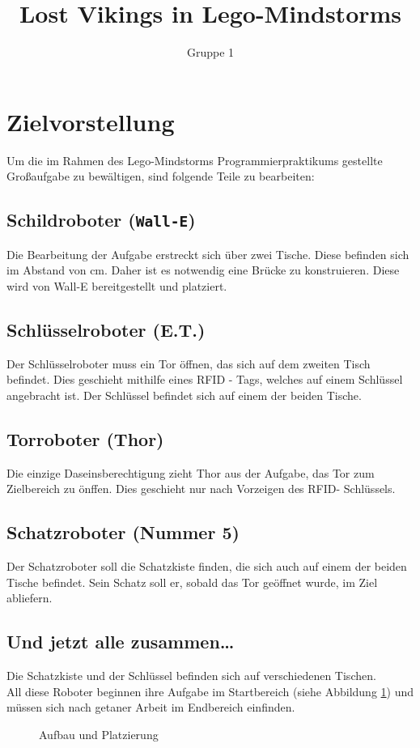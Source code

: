 \documentclass[a4paper]{scrartcl}
\title{Lost Vikings in Lego-Mindstorms}
\author{Gruppe 1}
\date{}
\begin{document}
	\maketitle
	\section{Zielvorstellung}
	Um die im Rahmen des Lego-Mindstorms Programmierpraktikums gestellte Großaufgabe zu bewältigen, sind folgende Teile zu bearbeiten:
	\subsection{Schildroboter (\texttt{Wall-E})}
	Die Bearbeitung der Aufgabe erstreckt sich über zwei Tische. Diese befinden sich im Abstand von \unit[15]{cm}. Daher ist es notwendig eine Brücke zu konstruieren. Diese wird von Wall-E bereitgestellt und platziert.
	\subsection{Schlüsselroboter (E.T.)}
	Der Schlüsselroboter muss ein Tor öffnen, das sich auf dem zweiten Tisch befindet. Dies geschieht mithilfe eines RFID%
- Tags, welches auf einem Schlüssel angebracht ist. Der Schlüssel befindet sich auf einem der beiden Tische.
	\subsection{Torroboter (Thor)}
	Die einzige Daseinsberechtigung zieht Thor aus der Aufgabe, das Tor zum Zielbereich zu önffen. Dies geschieht nur nach Vorzeigen des RFID- Schlüssels.
	\subsection{Schatzroboter (Nummer 5)}
	Der Schatzroboter soll die Schatzkiste finden, die sich auch auf einem der beiden Tische befindet. Sein Schatz soll er, sobald das Tor geöffnet wurde, im Ziel abliefern.
	\subsection{Und jetzt alle zusammen\dots}
	Die Schatzkiste und der Schlüssel befinden sich auf verschiedenen Tischen. \\
	All diese Roboter beginnen ihre Aufgabe im Startbereich (siehe Abbildung \ref{bild_tisch}) und müssen sich nach getaner Arbeit im Endbereich einfinden.
	\begin{figure}[H]
		\centering
		\def\svgwidth{12cm}
		
		\caption{Aufbau und Platzierung}
		\label{bild_tisch}
	\end{figure}
\end{document}
